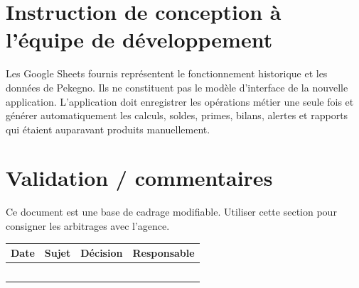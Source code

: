 \documentclass[11pt,a4paper]{article}
\begin{document}
\section{Instruction de conception à l'équipe de développement}

Les Google Sheets fournis représentent le fonctionnement historique et les données de Pekegno. Ils ne constituent pas le modèle d'interface de la nouvelle application. L'application doit enregistrer les opérations métier une seule fois et générer automatiquement les calculs, soldes, primes, bilans, alertes et rapports qui étaient auparavant produits manuellement.

\section{Validation / commentaires}

Ce document est une base de cadrage modifiable. Utiliser cette section pour consigner les arbitrages avec l'agence.

\begin{tabularx}{\textwidth}{|c|X|X|c|}
\hline
\textbf{Date} & \textbf{Sujet} & \textbf{Décision} & \textbf{Responsable} \\ \hline
\rule{0pt}{7mm} & & & \\ \hline
\rule{0pt}{7mm} & & & \\ \hline
\rule{0pt}{7mm} & & & \\ \hline
\rule{0pt}{7mm} & & & \\ \hline
\rule{0pt}{7mm} & & & \\ \hline
\end{tabularx}
\end{document}
